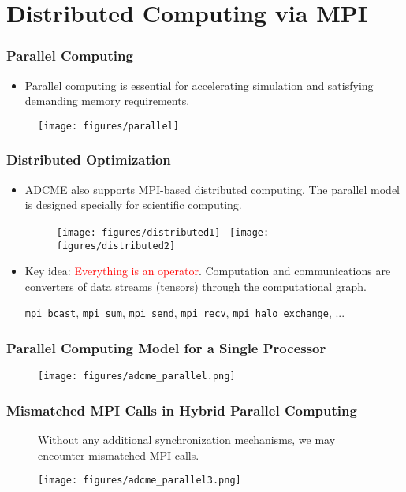 \documentclass[usenames,dvipsnames]{beamer}
\begin{document}
\section{Distributed Computing via MPI}
\begin{frame}
	\frametitle{Parallel Computing}
	\begin{itemize}
		\item Parallel computing is essential for accelerating simulation and satisfying demanding memory requirements.
	\end{itemize}
	\begin{figure}[hbt]
		\texttt{[image: figures/parallel]}
	\end{figure}
\end{frame}


\begin{frame}
	\frametitle{Distributed Optimization}
	\begin{itemize}
		\item ADCME also supports MPI-based distributed computing. The parallel model is designed specially for scientific computing. 

	\begin{figure}[hbt]
		\centering
		\texttt{[image: figures/distributed1]}~
		\texttt{[image: figures/distributed2]}
	\end{figure}

\item Key idea: \textcolor{red}{Everything is an operator}. Computation and communications are converters of data streams (tensors) through the computational graph. 

\begin{center}
\texttt{mpi\_bcast}, \texttt{mpi\_sum}, \texttt{mpi\_send}, \texttt{mpi\_recv}, \texttt{mpi\_halo\_exchange}, ...
\end{center}

	\end{itemize}
\end{frame}

\begin{frame}
	\frametitle{Parallel Computing Model for a Single Processor}
	\begin{figure}[hbt]
		\texttt{[image: figures/adcme\_parallel.png]}
	\end{figure}
\end{frame}


\begin{frame}
	\frametitle{Mismatched MPI Calls in Hybrid Parallel Computing}
	\begin{figure}
		\item Without any additional synchronization mechanisms, we may encounter mismatched MPI calls. 
	\end{figure}
	\begin{figure}[hbt]
		\texttt{[image: figures/adcme\_parallel3.png]}
	\end{figure}
\end{frame}
\end{document}
